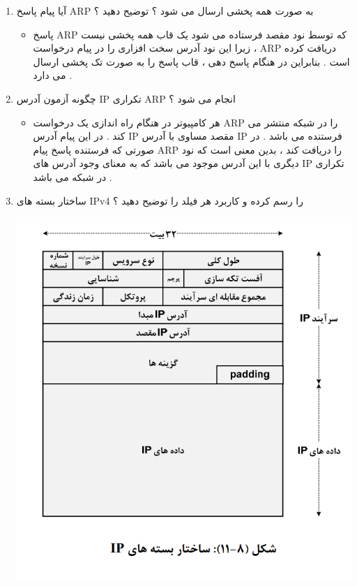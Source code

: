 \documentclass{article}
\begin{document}
\begin{enumerate}
\item آیا پیام پاسخ ARP به صورت همه پخشی ارسال می شود ؟ توضیح دهید ؟

\begin{tcolorbox}
\begin{itemize}
	\item پاسخ ARP 
	که توسط نود مقصد فرستاده می شود یک قاب همه پخشی نیست ، زیرا این نود آدرس سخت افزاری را در پیام درخواست ARP دریافت کرده است . بنابراین در هنگام پاسخ دهی ، قاب پاسخ را به صورت تک پخشی ارسال می دارد .
\end{itemize}
\end{tcolorbox}


\item چگونه آزمون آدرس IP تکراری ARP انجام می شود ؟

\begin{tcolorbox}
\begin{itemize}
	\item هر کامپیوتر در هنگام راه اندازی یک درخواست ARP
	را در شبکه منتشر می کند . در این پیام آدرس IP مقصد مساوی با آدرس IP فرستنده می باشد .
	در صورتی که فرستنده پاسخ پیام ARP 
	را دریافت کند ، بدین معنی است که نود دیگری با این آدرس موجود می باشد که به معنای وجود آدرس های IP تکراری در شبکه می باشد .
\end{itemize}
\end{tcolorbox}

\newpage

\item ساختار بسته های IPv4 را رسم کرده و کاربرد هر فیلد را توضیح دهید ؟

\begin{center}
	\includegraphics[scale=0.6]{./ip_1.png}
\end{center}


\end{enumerate}
\end{document}
